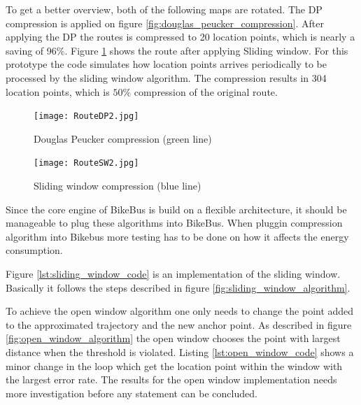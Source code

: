 To get a better overview, both of the following maps are rotated. The DP compression is applied on figure \ref{fig:douglas_peucker_compression}. After applying the DP the routes is compressed to 20 location points, which is nearly a saving of 96\%. Figure \ref{fig:sliding_window} shows the route after applying Sliding window. For this prototype the code simulates how location points arrives periodically to be processed by the sliding window algorithm. The compression results in 304 location points, which is $50\%$ compression of the original route.

\begin{figure}[H]
\centering
\begin{minipage}{0.49\textwidth}
\centering
    \texttt{[image: RouteDP2.jpg]}
    \caption{Douglas Peucker compression (green line)}
    \label{fig:douglas_peucker_compression}
\end{minipage}\hfill
\begin{minipage}{0.49\textwidth}
\centering
    \texttt{[image: RouteSW2.jpg]}
    \caption{Sliding window compression (blue line)}
    \label{fig:sliding_window}
\end{minipage}
\end{figure}

Since the core engine of BikeBus is build on a flexible architecture, it should be manageable to plug these algorithms into BikeBus. When pluggin compression algorithm into Bikebus more testing has to be done on how it affects the energy consumption.

Figure \ref{lst:sliding_window_code} is an implementation of the sliding window. Basically it follows the steps described in figure \ref{fig:sliding_window_algorithm}. 



To achieve the open window algorithm one only needs to change the point added to the approximated trajectory and the new anchor point. As described in figure \ref{fig:open_window_algorithm} the open window chooses the point with largest distance when the threshold is violated. Listing \ref{lst:open_window_code} shows a minor change in the loop which get the location point within the window with the largest error rate. The results for the open window implementation needs more investigation before any statement can be concluded. 



